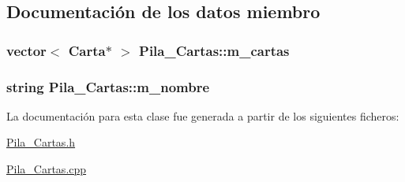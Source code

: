 \subsection{Documentación de los datos miembro}
\hypertarget{class_pila___cartas_a368fb39691e2398459f5db68ca3d4f51}{
\subsubsection[{m\-\_\-cartas}]{\setlength{\rightskip}{0pt plus 5cm}vector$<$ {\bf Carta}$\ast$ $>$ Pila\-\_\-\-Cartas\-::m\-\_\-cartas\hspace{0.3cm}{\ttfamily [protected]}}}\label{class_pila___cartas_a368fb39691e2398459f5db68ca3d4f51}
\hypertarget{class_pila___cartas_a8e8da97e9a50cd472c745df138b5bf08}{
\subsubsection[{m\-\_\-nombre}]{\setlength{\rightskip}{0pt plus 5cm}string Pila\-\_\-\-Cartas\-::m\-\_\-nombre\hspace{0.3cm}{\ttfamily [protected]}}}\label{class_pila___cartas_a8e8da97e9a50cd472c745df138b5bf08}


La documentación para esta clase fue generada a partir de los siguientes ficheros\-:\begin{DoxyCompactItemize}
\item 
\hyperlink{_pila___cartas_8h}{Pila\-\_\-\-Cartas.\-h}\item 
\hyperlink{_pila___cartas_8cpp}{Pila\-\_\-\-Cartas.\-cpp}\end{DoxyCompactItemize}
